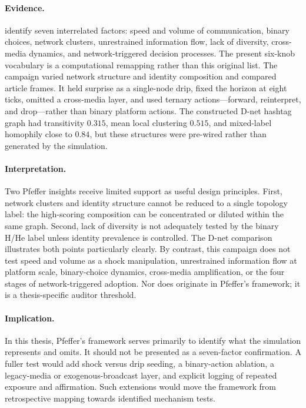 \paragraph{Evidence.}
\textcite{pfeffer2014firestorms} identify seven interrelated factors: speed
and volume of communication, binary choices, network clusters, unrestrained
information flow, lack of diversity, cross-media dynamics, and
network-triggered decision processes.  The present six-knob vocabulary is a
computational remapping rather than this original list.  The campaign varied
network structure and identity composition and compared article frames.  It
held surprise as a single-node drip, fixed the horizon at eight ticks, omitted
a cross-media layer, and used ternary actions---forward, reinterpret, and
drop---rather than binary platform actions.  The constructed D-net hashtag graph had
transitivity $0.315$, mean local clustering $0.515$, and mixed-label
homophily close to $0.84$, but these structures were pre-wired rather than
generated by the simulation.

\paragraph{Interpretation.}
Two Pfeffer insights receive limited support as useful design principles.
First, network clusters and identity structure cannot be reduced to a single
topology label: the high-scoring composition can be concentrated or diluted
within the same graph.  Second, lack of diversity is not adequately tested by
the binary H/He label unless identity prevalence is controlled.  The D-net
comparison illustrates both points particularly clearly.  By contrast, this
campaign does not test speed and volume as a shock manipulation,
unrestrained information flow at platform scale, binary-choice dynamics,
cross-media amplification, or the four stages of network-triggered adoption.
Nor does \kstar{} originate in Pfeffer's framework; it is a thesis-specific
auditor threshold.

\paragraph{Implication.}
In this thesis, Pfeffer's framework serves primarily to identify what the
simulation represents and omits.  It should not be presented as a
seven-factor confirmation.  A fuller test would add shock versus drip
seeding, a binary-action ablation, a legacy-media or exogenous-broadcast
layer, and explicit logging of repeated exposure and affirmation.  Such
extensions would move the framework from retrospective mapping towards
identified mechanism tests.

